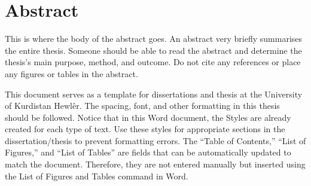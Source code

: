 \chapter*{Abstract}

\begin{justify}
This is where the body of the abstract goes.  An abstract very briefly summarises the entire thesis.  Someone should be able to read the abstract and determine the thesis's main purpose, method, and outcome.  Do not cite any references or place any figures or tables in the abstract.

\newendline This document serves as a template for dissertations and thesis at the University of Kurdistan Hewlêr.  The spacing, font, and other formatting in this thesis should be followed.  Notice that in this Word document, the Styles are already created for each type of text.  Use these styles for appropriate sections in the dissertation/thesis to prevent formatting errors.  The “Table of Contents,” “List of Figures,” and “List of Tables” are fields that can be automatically updated to match the document.  Therefore, they are not entered manually but inserted using the List of Figures and Tables command in Word.
\end{justify}

\clearpage